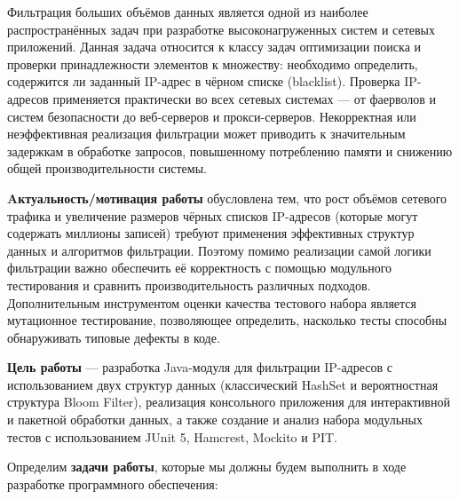 Фильтрация больших объёмов данных является одной из наиболее распространённых задач при разработке высоконагруженных систем и сетевых приложений. Данная задача относится к классу задач оптимизации поиска и проверки принадлежности элементов к множеству: необходимо определить, содержится ли заданный IP-адрес в чёрном списке (blacklist). Проверка IP-адресов применяется практически во всех сетевых системах — от фаерволов и систем безопасности до веб-серверов и прокси-серверов. Некорректная или неэффективная реализация фильтрации может приводить к значительным задержкам в обработке запросов, повышенному потреблению памяти и снижению общей производительности системы.

\textbf{Aктуальность/мотивация работы} обусловлена тем, что рост объёмов сетевого трафика и увеличение размеров чёрных списков IP-адресов (которые могут содержать миллионы записей) требуют применения эффективных структур данных и алгоритмов фильтрации. Поэтому помимо реализации самой логики фильтрации важно обеспечить её корректность с помощью модульного тестирования и сравнить производительность различных подходов. Дополнительным инструментом оценки качества тестового набора является мутационное тестирование, позволяющее определить, насколько тесты способны обнаруживать типовые дефекты в коде. 




\textbf{Цель работы} --- разработка Java-модуля для фильтрации IP-адресов с использованием двух структур данных (классический HashSet и вероятностная структура Bloom Filter), реализация консольного приложения для интерактивной и пакетной обработки данных, а также создание и анализ набора модульных тестов с использованием JUnit 5, Hamcrest, Mockito и PIT.

Определим \textbf{задачи работы}, которые мы должны будем выполнить в ходе разработке программного обеспечения:

